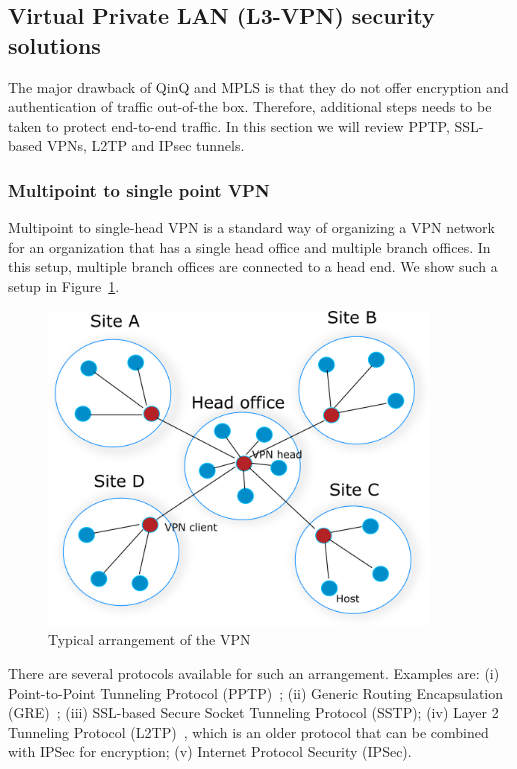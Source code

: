 \subsection{Virtual Private LAN (L3-VPN) security solutions}

The major drawback of QinQ and MPLS is that they do not offer encryption and 
authentication of traffic out-of-the box. Therefore, additional steps needs to be taken to protect end-to-end
traffic. In this section we will review PPTP, SSL-based VPNs, L2TP and IPsec tunnels.

\subsubsection{Multipoint to single point VPN}

Multipoint to single-head VPN is a standard way of organizing a VPN network
for an organization that has a single head office and multiple branch offices.
In this setup, multiple branch offices are connected to a head end. 
We show such a setup in Figure~\ref{fig:head-vpn}.

\begin{figure}[ht!]
    \centering
    \includegraphics[width=0.9\textwidth]{graphics/vpn-central.png}
    \caption{Typical arrangement of the VPN}
    \label{fig:head-vpn}
\end{figure}

There are several protocols available for such an arrangement. Examples are:
(i) Point-to-Point Tunneling Protocol (PPTP)~\cite{tcpip}; (ii) Generic Routing Encapsulation (GRE)~\cite{tcpip}; 
(iii) SSL-based Secure Socket Tunneling Protocol (SSTP); (iv) Layer 2 Tunneling Protocol (L2TP)~\cite{tcpip}, 
which is an older protocol that can be combined with IPSec for encryption;
(v) Internet Protocol Security (IPSec).

